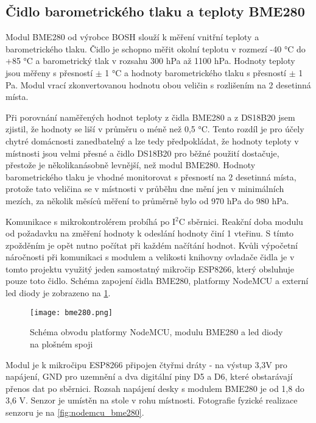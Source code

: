 \subsection{Čidlo barometrického tlaku a teploty BME280}

Modul BME280 od výrobce BOSH slouží k měření vnitřní teploty a barometrického tlaku. Čidlo je schopno měřit okolní teplotu v rozmezí -40 \si{\degree}C do +85 \si{\degree}C a barometrický tlak v rozsahu 300 \si{hPa} až 1100 \si{hPa}. Hodnoty teploty jsou měřeny s přesností $\pm$ 1 \si{\degree}C a hodnoty barometrického tlaku s přesností $\pm$ 1 \si{Pa}. Modul vrací zkonvertovanou hodnotu obou veličin s rozlišením na 2 desetinná místa. \par
Při porovnání naměřených hodnot teploty z čidla BME280 a z DS18B20 jsem zjistil, že hodnoty se liší v průměru o méně než 0,5 \si{\degree}C. Tento rozdíl je pro účely chytré domácnosti zanedbatelný a lze tedy předpokládat, že hodnoty teploty v místnosti jsou velmi přesné a čidlo DS18B20 pro běžné použití dostačuje, přestože je několikanásobně levnější, než modul BME280. Hodnoty barometrického tlaku je vhodné monitorovat s přesností na 2 desetinná místa, protože tato veličina se v místnosti v průběhu dne mění jen v minimálních mezích, za několik měsíců měření to průměrně bylo od 970 \si{hPa} do 980 \si{hPa}.\par
Komunikace s mikrokontrolérem probíhá po I$^2$C sběrnici. Reakční doba modulu od požadavku na změření hodnoty k odeslání hodnoty činí 1 vteřinu. S tímto zpožděním je opět nutno počítat při každém načítání hodnot. Kvůli výpočetní náročnosti při komunikaci s modulem a velikosti knihovny ovladače čidla je v tomto projektu využitý jeden samostatný mikročip ESP8266, který obsluhuje pouze toto čidlo. Schéma zapojení čidla BME280, platformy NodeMCU a externí led diody je zobrazeno na \cref{fig:schema_esp_bme280}.

\begin{figure}[H]
  \centering
  \texttt{[image: bme280.png]}
  \caption{Schéma obvodu platformy NodeMCU, modulu BME280 a led diody na plošném spoji}
  \label{fig:schema_esp_bme280}
\end{figure}

Modul je k mikročipu ESP8266 připojen čtyřmi dráty - na výstup 3,3V pro napájení, GND pro uzemnění a dva digitální piny D5 a D6, které obstarávají přenos dat po sběrnici. Rozsah napájení desky s modulem BME280 je od 1,8 do 3,6 V. Senzor je umístěn na stole v rohu místnosti. Fotografie fyzické realizace senzoru je na \cref{fig:nodemcu_bme280}.

